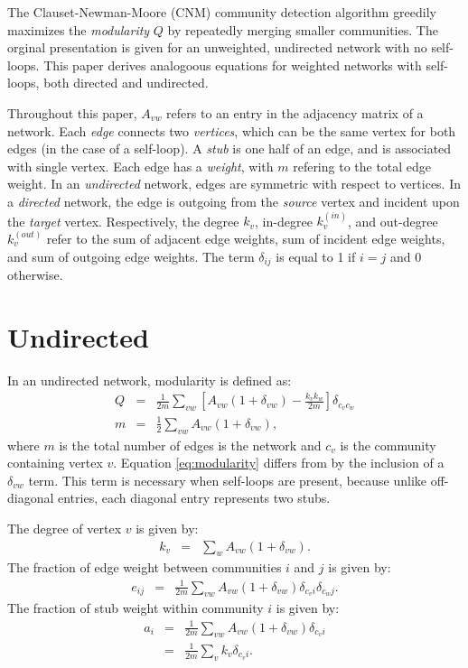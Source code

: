 \documentclass{article}
\newcommand{\beq}{\begin{eqnarray}}
\newcommand{\eeq}{\end{eqnarray}}
\begin{document}
The Clauset-Newman-Moore (CNM) community detection algorithm \cite{clauset_finding_2004}
greedily maximizes the {\em modularity} $Q$ by repeatedly merging smaller communities.
The orginal presentation is given for an unweighted, undirected network with no self-loops.
This paper derives analogoous equations for weighted networks with self-loops,
both directed and undirected.

Throughout this paper, $A_{vw}$ refers to an entry in the adjacency matrix of a network.
Each {\em edge} connects two {\em vertices},
which can be the same vertex for both edges (in the case of a self-loop).
A {\em stub} is one half of an edge, and is associated with single vertex.
Each edge has a {\em weight}, with $m$ refering to the total edge weight.
In an {\em undirected} network, edges are symmetric with respect to vertices.
In a {\em directed} network, the edge is outgoing from the {\em source} vertex
and incident upon the {\em target} vertex.
Respectively, the degree $k_v$, in-degree $k_v^{(in)}$, and out-degree $k_v^{(out)}$ refer to the
sum of adjacent edge weights, sum of incident edge weights, and sum of outgoing edge weights.
The term $\delta_{ij}$ is equal to 1 if $i = j$ and 0 otherwise.

\section{Undirected}
In an undirected network, modularity is defined as:
\beq
\label{eq:modularity} Q &=& \frac{1}{2m} \sum_{vw} \left[ A_{vw} (1 + \delta_{vw}) - \frac{k_v k_w}{2m} \right]\delta_{c_v c_w} \\
m &=& \frac{1}{2} \sum_{vw} A_{vw} (1 + \delta_{vw}),
\eeq
where $m$ is the total number of edges is the network and $c_v$ is the community containing vertex $v$.
Equation \ref{eq:modularity} differs from \cite{clauset_finding_2004} by the inclusion of a $\delta_{vw}$ term.
This term is necessary when self-loops are present,
because unlike off-diagonal entries, each diagonal entry represents two stubs.

The degree of vertex $v$ is given by:
\beq
k_v &=& \sum_w A_{vw} (1+\delta_{vw}).
\eeq
The fraction of edge weight between communities $i$ and $j$ is given by:
\beq
e_{ij} &=& \frac{1}{2m}\sum_{vw} A_{vw} (1+\delta_{vw}) \delta_{c_vi}\delta_{c_wj}.
\eeq
The fraction of stub weight within community $i$ is given by:
\beq
a_i &=& \frac{1}{2m}\sum_{vw}A_{vw} (1 + \delta_{vw}) \delta_{c_vi} \\
&=& \frac{1}{2m}\sum_v k_v \delta_{c_vi}.
\eeq
\end{document}
